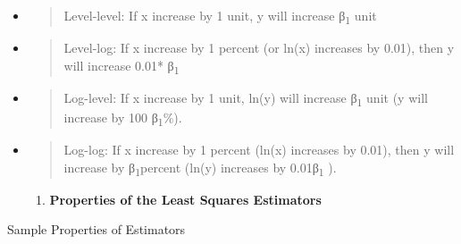 \begin{itemize}
\item
  \begin{quote}
  Level-level: If x increase by 1 unit, y will increase
  β\textsubscript{1} unit
  \end{quote}
\item
  \begin{quote}
  Level-log: If x increase by 1 percent (or ln(x) increases by 0.01),
  then y will increase 0.01* β\textsubscript{1}
  \end{quote}
\item
  \begin{quote}
  Log-level: If x increase by 1 unit, ln(y) will increase
  β\textsubscript{1} unit (y will increase by 100 β\textsubscript{1}\%).
  \end{quote}
\item
  \begin{quote}
  Log-log: If x increase by 1 percent (ln(x) increases by 0.01), then y
  will increase by β\textsubscript{1}percent (ln(y) increases by
  0.01β\textsubscript{1} ).
  \end{quote}

  \begin{enumerate}
  \def\labelenumi{\arabic{enumi}.}
  \setcounter{enumi}{4}
  \item
    \textbf{Properties of the Least Squares Estimators}
  \end{enumerate}
\end{itemize}

Sample Properties of Estimators

